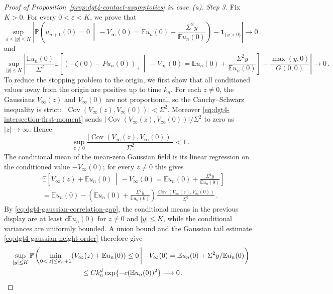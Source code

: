 \documentclass[11pt]{amsart}
\theoremstyle{plain}
\theoremstyle{definition}
\newcommand{\E}{\mathbb{E}}
\renewcommand{\P}{\mathbb{P}}
\DeclareMathOperator{\Cov}{Cov}
\newcommand{\one}{\mathbf{1}}
\begin{document}
\begin{proof}[Proof of Proposition~\ref{prop:dgt4-contact-asymptotics} in case~\textup{(a)}]
	\noindent\emph{Step 3.} Fix $K>0$.
	For every $0<\varepsilon<K$, we prove that
	\begin{equation}\label{eq:dgt4-gaussian-conditional-contact}
		\sup_{\varepsilon\leq|y|\leq K}\left|
		\P\left(u_{n+1}(0)=0\,\middle|\,-V_\infty(0)=\E u_n(0)+\frac{\Sigma^2y}{\E u_n(0)}\right)-\one_{\{y>0\}}
		\right|\longrightarrow0\, .
	\end{equation}
	and
	\begin{equation}\label{eq:dgt4-gaussian-reflected-limit}
		\sup_{|y|\leq K}\left|
		\frac{\E u_n(0)}{\Sigma^2}
		\E\left[
			(-\zeta(0)-Pu_n(0))_+
			\,\middle|\,
			-V_\infty(0)=\E u_n(0)+\frac{\Sigma^2y}{\E u_n(0)}
		\right]
		-\frac{\max(y,0)}{G(0,0)}
		\right|\longrightarrow0\, .
	\end{equation}
	To reduce the stopping problem to the origin, we first show that all
	conditioned values away from the origin are positive up to time $k_n$.
	For each $z\ne0$, the Gaussians $V_\infty(z)$ and $V_\infty(0)$ are not proportional, so the
	Cauchy--Schwarz inequality is strict: $|\Cov(V_\infty(z),V_\infty(0))|<\Sigma^2$. Moreover
	\eqref{eq:dgt4-intersection-first-moment} sends $|\Cov(V_\infty(z),V_\infty(0))|/\Sigma^2$ to
	zero as $|z|\to\infty$. Hence
	\begin{equation}\label{eq:dgt4-gaussian-correlation-gap}
		\sup_{z\ne0}\frac{|\Cov(V_\infty(z),V_\infty(0))|}{\Sigma^2}<1\, .
	\end{equation}
	The conditional mean of the mean-zero Gaussian field is its linear regression
	on the conditioned value $-V_\infty(0)$; for every $z\ne0$ this gives
	\[
	\begin{aligned}
		&\E\left[
		V_\infty(z)+\E u_n(0)
		\,\middle|\,
		-V_\infty(0)=\E u_n(0)+\frac{\Sigma^2y}{\E u_n(0)}
		\right]\\
		&=
		\E u_n(0)
		-
		\left(\E u_n(0)+\frac{\Sigma^2y}{\E u_n(0)}\right)
		\frac{\Cov(V_\infty(z),V_\infty(0))}{\Sigma^2}\, .
	\end{aligned}
	\]
	By \eqref{eq:dgt4-gaussian-correlation-gap}, the conditional means in the previous
	display are at least $c\E u_n(0)$ for $z\ne0$ and $|y|\leq K$, while the
	conditional variances are uniformly bounded. A union bound and the Gaussian
	tail estimate
	\eqref{eq:dgt4-gaussian-height-order} therefore give
	\begin{equation}\label{eq:dgt4-gaussian-positive-off-origin}
	\begin{aligned}
		&\sup_{|y|\leq K}
		\P\left(
		\min_{0<|z|\leq k_n+1}(V_\infty(z)+\E u_n(0))\leq0
		\,\middle|\,-V_\infty(0)=\E u_n(0)+\Sigma^2y/\E u_n(0)
		\right)\\
		&\hspace{35mm}\leq
		Ck_n^d\exp\{-c(\E u_n(0))^2\}
		\longrightarrow0\, .
	\end{aligned}
	\end{equation}


\end{proof}
\end{document}
